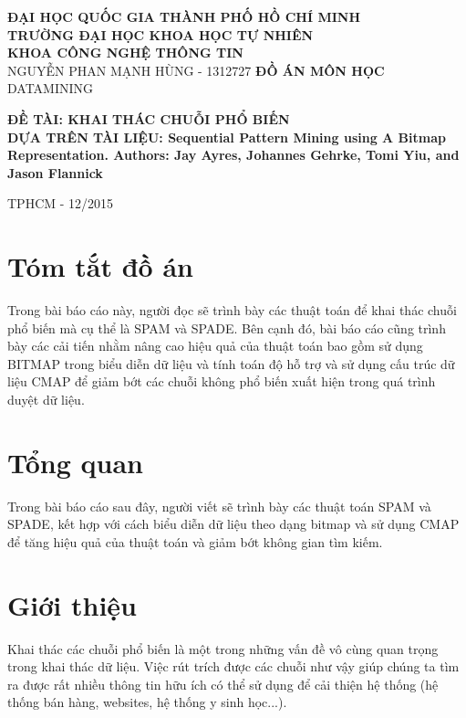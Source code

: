 \documentclass[a4paper 14pt]{article}
\begin{document}
	\begin{titlepage}
		\begin{center}
			\large{\textbf{ĐẠI HỌC QUỐC GIA THÀNH PHỐ HỒ CHÍ MINH}}\\
			\large{\textbf{TRƯỜNG ĐẠI HỌC KHOA HỌC TỰ NHIÊN}}\\
			\large{\textbf{KHOA CÔNG NGHỆ THÔNG TIN}}\\
			
			\vfill
			NGUYỄN PHAN MẠNH HÙNG - 1312727
			\vfill
			\Large{\textbf{ĐỒ ÁN MÔN HỌC }}\\
			\Large{DATAMINING}\\
		\end{center}
		\begin{flushleft}
			\vfill
			\large{\textbf{ĐỀ TÀI: KHAI THÁC CHUỖI PHỔ BIẾN}}\\
			\large{\textbf{DỰA TRÊN TÀI LIỆU: Sequential Pattern Mining using A Bitmap Representation. Authors: Jay Ayres, Johannes Gehrke, Tomi Yiu, and Jason Flannick}}
			\vfill
		\end{flushleft}
		\begin{center}
			TPHCM - 12/2015
		\end{center}
		
	\end{titlepage}
	\thispagestyle{empty}
	\tableofcontents
	\pagebreak
	\section*{Tóm tắt đồ án}
		Trong bài báo cáo này, người đọc sẽ trình bày các thuật toán để khai thác chuỗi phổ biến mà cụ thể là SPAM và SPADE. Bên cạnh đó, bài báo cáo cũng trình bày các cải tiến nhằm nâng cao hiệu quả của thuật toán bao gồm sử dụng BITMAP trong biểu diễn dữ liệu và tính toán độ hỗ trợ và sử dụng cấu trúc dữ liệu CMAP để giảm bớt các chuỗi không phổ biến xuất hiện trong quá trình duyệt dữ liệu.
	\section*{Tổng quan}
		Trong bài báo cáo sau đây, người viết sẽ trình bày các thuật toán SPAM và SPADE, kết hợp với cách biểu diễn dữ liệu theo dạng bitmap và sử dụng CMAP để tăng hiệu quả của thuật toán và giảm bớt không gian tìm kiếm.
	\section{Giới thiệu}
		Khai thác các chuỗi phổ biến là một trong những vấn đề vô cùng quan trọng trong khai thác dữ liệu. Việc rút trích được các chuỗi như vậy giúp chúng ta tìm ra được rất nhiều thông tin hữu ích có thể sử dụng để cải thiện hệ thống (hệ thống bán hàng, websites, hệ thống y sinh học...).
\end{document}

